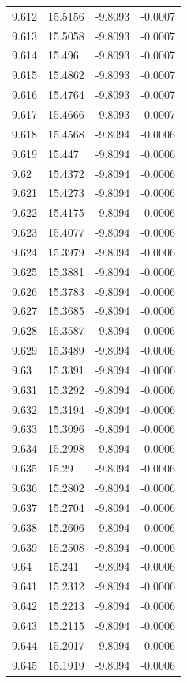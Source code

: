 \begin{tabular}{llll}
9.612 & 15.5156 & -9.8093 & -0.0007 \\
9.613 & 15.5058 & -9.8093 & -0.0007 \\
9.614 & 15.496 & -9.8093 & -0.0007 \\
9.615 & 15.4862 & -9.8093 & -0.0007 \\
9.616 & 15.4764 & -9.8093 & -0.0007 \\
9.617 & 15.4666 & -9.8093 & -0.0007 \\
9.618 & 15.4568 & -9.8094 & -0.0006 \\
9.619 & 15.447 & -9.8094 & -0.0006 \\
9.62 & 15.4372 & -9.8094 & -0.0006 \\
9.621 & 15.4273 & -9.8094 & -0.0006 \\
9.622 & 15.4175 & -9.8094 & -0.0006 \\
9.623 & 15.4077 & -9.8094 & -0.0006 \\
9.624 & 15.3979 & -9.8094 & -0.0006 \\
9.625 & 15.3881 & -9.8094 & -0.0006 \\
9.626 & 15.3783 & -9.8094 & -0.0006 \\
9.627 & 15.3685 & -9.8094 & -0.0006 \\
9.628 & 15.3587 & -9.8094 & -0.0006 \\
9.629 & 15.3489 & -9.8094 & -0.0006 \\
9.63 & 15.3391 & -9.8094 & -0.0006 \\
9.631 & 15.3292 & -9.8094 & -0.0006 \\
9.632 & 15.3194 & -9.8094 & -0.0006 \\
9.633 & 15.3096 & -9.8094 & -0.0006 \\
9.634 & 15.2998 & -9.8094 & -0.0006 \\
9.635 & 15.29 & -9.8094 & -0.0006 \\
9.636 & 15.2802 & -9.8094 & -0.0006 \\
9.637 & 15.2704 & -9.8094 & -0.0006 \\
9.638 & 15.2606 & -9.8094 & -0.0006 \\
9.639 & 15.2508 & -9.8094 & -0.0006 \\
9.64 & 15.241 & -9.8094 & -0.0006 \\
9.641 & 15.2312 & -9.8094 & -0.0006 \\
9.642 & 15.2213 & -9.8094 & -0.0006 \\
9.643 & 15.2115 & -9.8094 & -0.0006 \\
9.644 & 15.2017 & -9.8094 & -0.0006 \\
9.645 & 15.1919 & -9.8094 & -0.0006 \\

\end{tabular}
